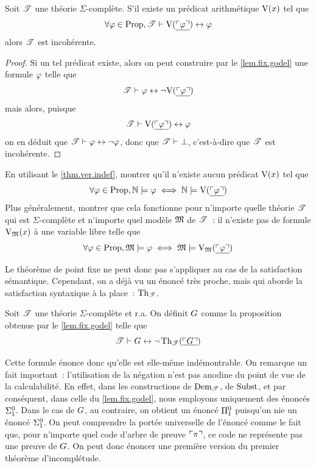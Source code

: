 \begin{theorem}
  \label{thm.ver.indef}
  Soit $\mathscr T$ une théorie $\Sigma$-complète. S'il existe un prédicat
  arithmétique $\mathrm{V}(x)$ tel que
  \[\forall \varphi \in \operatorname{Prop}, \mathscr T \vdash
  \mathrm{V}(\underline{\ulcorner\varphi\urcorner}) \mathrel{\leftrightarrow} \varphi\]
  alors $\mathscr T$ est incohérente.
\end{theorem}

\begin{proof}
  Si un tel prédicat existe, alors on peut construire par le
  \cref{lem.fix.godel} une formule $\varphi$ telle que
  \[\mathscr T \vdash \varphi \mathrel{\leftrightarrow} \lnot \mathrm{V}(\underline{\ulcorner\varphi\urcorner})\]
  mais alors, puisque
  \[\mathscr T \vdash \mathrm{V}(\underline{\ulcorner\varphi\urcorner}) \mathrel{\leftrightarrow} \varphi\]
  on en déduit que $\mathscr T \vdash \varphi \mathrel{\leftrightarrow} \lnot \varphi$, donc que
  $\mathscr T \vdash \bot$, c'est-à-dire que $\mathscr T$ est incohérente.
\end{proof}

\begin{exercise}
  En utilisant le \cref{thm.ver.indef}, montrer qu'il n'existe aucun prédicat
  $\mathrm{V}(x)$ tel que
  \[\forall \varphi \in \operatorname{Prop}, \mathbb N \models \varphi \iff \mathbb N \models
  \mathrm{V}(\underline{\ulcorner\varphi\urcorner})\]
  Plus généralement, montrer que cela fonctionne pour n'importe quelle théorie
  $\mathscr T$ qui est $\Sigma$-complète et n'importe quel modèle $\mathfrak{M}$ de
  $\mathscr T$~: il n'existe pas de formule $\mathrm{V}_{\mathfrak{M}}(x)$ à une variable libre
  telle que
  \[\forall \varphi \in \operatorname{Prop}, \mathfrak{M} \models \varphi \iff
  \mathfrak{M} \models \mathrm{V}_{\mathfrak{M}}(\underline{\ulcorner\varphi\urcorner})\]
\end{exercise}

Le théorème de point fixe ne peut donc pas s'appliquer au cas de la satisfaction
sémantique. Cependant, on a déjà vu un énoncé très proche, mais qui aborde la
satisfaction syntaxique à la place~: $\operatorname{Th}_{\mathscr T}$.

\begin{definition}
  Soit $\mathscr T$ une théorie $\Sigma$-complète et r.a. On définit $G$ comme
  la proposition obtenue par le \cref{lem.fix.godel} telle que
  \[\mathscr T \vdash G \mathrel{\leftrightarrow} \lnot \operatorname{Th}_{\mathscr T}(\underline{\ulcorner G\urcorner})\]
\end{definition}

Cette formule énonce donc qu'elle est elle-même indémontrable. On remarque un
fait important~: l'utilisation de la négation n'est pas anodine du point de vue
de la calculabilité. En effet, dans les constructions de $\operatorname{Dem}_{\mathscr T}$,
de $\operatorname{Subst}$, et par conséquent, dans celle du \cref{lem.fix.godel},
nous employons uniquement des énoncés $\Sigma^0_{1}$. Dans le cas de $G$,
au contraire, on obtient un énoncé $\Pi^0_{1}$ puisqu'on nie un énoncé
$\Sigma^0_{1}$. On peut comprendre la portée universelle de l'énoncé comme le
fait que, pour n'importe quel code d'arbre de preuve $\ulcorner\pi\urcorner$, ce code
ne représente pas une preuve de $G$. On peut donc énoncer une première
version du premier théorème d'incomplétude.

